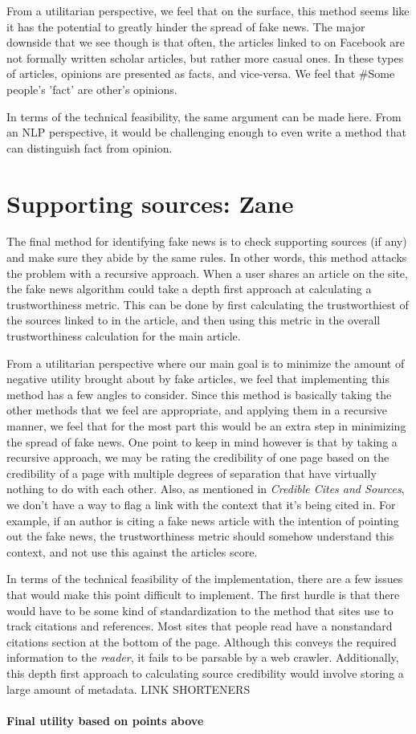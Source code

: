 \documentclass[12pt]{article}
\begin{document}
From a utilitarian perspective, we feel that on the surface, this method seems like it has the potential to greatly hinder the spread of fake news. The major downside that we see though is that often, the articles linked to on Facebook are not formally written scholar articles, but rather more casual ones. In these types of articles, opinions are presented as facts, and vice-versa. We feel that 
#Some people's 'fact' are other's opinions.

In terms of the technical feasibility, the same argument can be made here. From an NLP perspective, it would be challenging enough to even write a method that can distinguish fact from opinion.

\section{Supporting sources: Zane}
The final method for identifying fake news is to check supporting sources (if any) and make sure they abide by the same rules. In other words, this method attacks the problem with a recursive approach. When a user shares an article on the site, the fake news algorithm could take a depth first approach at calculating a trustworthiness metric. This can be done by first calculating the trustworthiest of the sources linked to in the article, and then using this metric in the overall trustworthiness calculation for the main article. 

From a utilitarian perspective where our main goal is to minimize the amount of negative utility brought about by fake articles, we feel that implementing this method has a few angles to consider. Since this method is basically taking the other methods that we feel are appropriate, and applying them in a recursive manner, we feel that for the most part this would be an extra step in minimizing the spread of fake news. One point to keep in mind however is that by taking a recursive approach, we may be rating the credibility of one page based on the credibility of a page with multiple degrees of separation that have virtually nothing to do with each other. Also, as mentioned in \textit{Credible Cites and Sources}, we don't have a way to flag a link with the context that it's being cited in. For example, if an author is citing a fake news article with the intention of pointing out the fake news, the trustworthiness metric should somehow understand this context, and not use this against the articles score.

In terms of the technical feasibility of the implementation, there are a few issues that would make this point difficult to implement. The first hurdle is that there would have to be some kind of standardization to the method that sites use to track citations and references. Most sites that people read have a nonstandard citations section at the bottom of the page. Although this conveys the required information to the \textit{reader}, it fails to be parsable by a web crawler. Additionally, this depth first approach to calculating source credibility would involve storing a large amount of metadata. LINK SHORTENERS


\paragraph{Final utility based on points above}

\newpage


\end{document}
